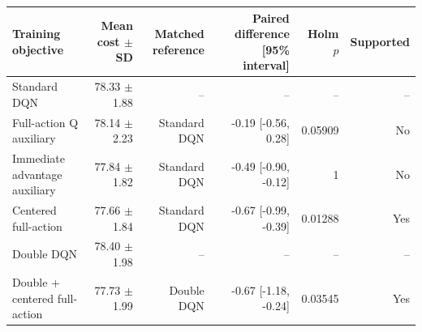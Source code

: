 \begin{tabular}{lrrrrr}
\toprule
Training objective & Mean cost $\pm$ SD & Matched reference & Paired difference [95\% interval] & Holm $p$ & Supported \\
\midrule
Standard DQN & 78.33 $\pm$ 1.88 & -- & -- & -- & -- \\
Full-action Q auxiliary & 78.14 $\pm$ 2.23 & Standard DQN & -0.19 [-0.56, 0.28] & 0.05909 & No \\
Immediate advantage auxiliary & 77.84 $\pm$ 1.82 & Standard DQN & -0.49 [-0.90, -0.12] & 1 & No \\
Centered full-action & 77.66 $\pm$ 1.84 & Standard DQN & -0.67 [-0.99, -0.39] & 0.01288 & Yes \\
Double DQN & 78.40 $\pm$ 1.98 & -- & -- & -- & -- \\
Double + centered full-action & 77.73 $\pm$ 1.99 & Double DQN & -0.67 [-1.18, -0.24] & 0.03545 & Yes \\
\bottomrule
\end{tabular}